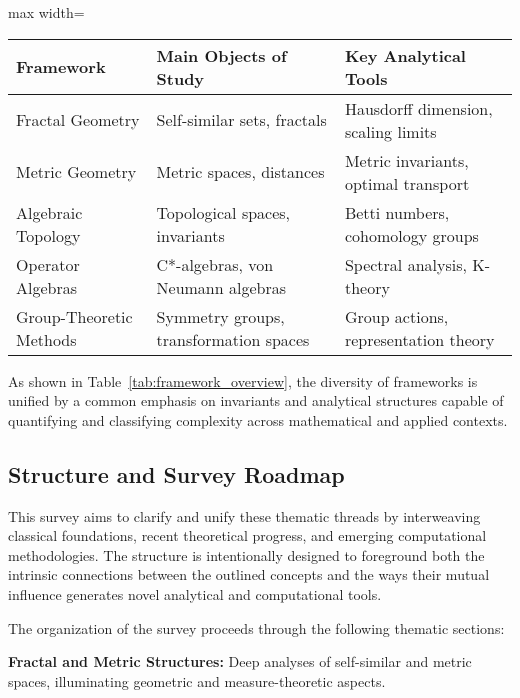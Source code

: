 \documentclass[sigconf]{acmart}
\begin{document}
\begin{table*}[htbp]
\centering
\caption{Principal Frameworks, Core Objects, and Key Analytical Tools}
\label{tab:framework_overview}
\begin{adjustbox}{max width=\textwidth}
\begin{tabular}{lll}
\toprule
\textbf{Framework}         & \textbf{Main Objects of Study}         & \textbf{Key Analytical Tools}             \\
\midrule
Fractal Geometry           & Self-similar sets, fractals            & Hausdorff dimension, scaling limits       \\
Metric Geometry            & Metric spaces, distances                & Metric invariants, optimal transport      \\
Algebraic Topology         & Topological spaces, invariants          & Betti numbers, cohomology groups          \\
Operator Algebras          & C*-algebras, von Neumann algebras       & Spectral analysis, K-theory               \\
Group-Theoretic Methods    & Symmetry groups, transformation spaces  & Group actions, representation theory      \\
\bottomrule
\end{tabular}
\end{adjustbox}
\end{table*}

As shown in Table~\ref{tab:framework_overview}, the diversity of frameworks is unified by a common emphasis on invariants and analytical structures capable of quantifying and classifying complexity across mathematical and applied contexts.

\subsection{Structure and Survey Roadmap}

This survey aims to clarify and unify these thematic threads by interweaving classical foundations, recent theoretical progress, and emerging computational methodologies. The structure is intentionally designed to foreground both the intrinsic connections between the outlined concepts and the ways their mutual influence generates novel analytical and computational tools.

The organization of the survey proceeds through the following thematic sections:

\textbf{Fractal and Metric Structures:} Deep analyses of self-similar and metric spaces, illuminating geometric and measure-theoretic aspects.
\end{document}
